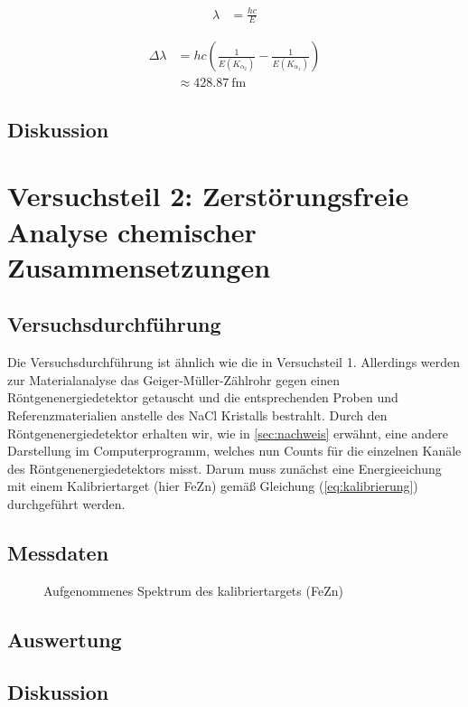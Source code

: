 \documentclass[10pt, a4paper]{article}
\begin{document}
\begin{align}
  \lambda &= \frac{h c}{E}
\end{align}

\begin{align*}
  \Delta \lambda &= h c \left( \frac{1}{E(K_{\alpha_2})} - \frac{1}{E(K_{\alpha_1})} \right) \\
  &\approx \SI{428,87}{\femto\metre}
\end{align*}

\begin{table}
\centering

\end{table}
\subsection{Diskussion}

\section{Versuchsteil 2: Zerstörungsfreie Analyse chemischer Zusammensetzungen}
\subsection{Versuchsdurchführung}
Die Versuchsdurchführung ist ähnlich wie die in Versuchsteil 1.
Allerdings werden zur Materialanalyse das Geiger-Müller-Zählrohr gegen einen Röntgenenergiedetektor getauscht und die entsprechenden Proben und Referenzmaterialien anstelle des NaCl Kristalls bestrahlt.
Durch den Röntgenenergiedetektor erhalten wir, wie in \ref{sec:nachweis} erwähnt, eine andere Darstellung im Computerprogramm, welches nun Counts für die einzelnen Kanäle des Röntgenenergiedetektors misst. Darum muss zunächst eine Energieeichung mit einem Kalibriertarget (hier FeZn) gemäß Gleichung (\ref{eq:kalibrierung}) durchgeführt werden.
\subsection{Messdaten}
\begin{figure}
\centering

\caption{Aufgenommenes Spektrum des kalibriertargets (FeZn)}
\label{fig:kalibrierung}
\end{figure}
\subsection{Auswertung}
\subsection{Diskussion}
\end{document}
